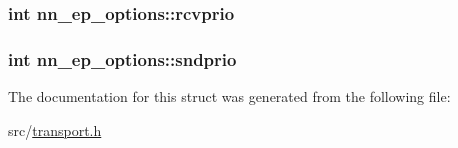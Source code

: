 \subsubsection[{rcvprio}]{\setlength{\rightskip}{0pt plus 5cm}int nn\+\_\+ep\+\_\+options\+::rcvprio}\hypertarget{structnn__ep__options_ad767f9fdbda05049cdb00e5122de9c7f}{}\label{structnn__ep__options_ad767f9fdbda05049cdb00e5122de9c7f}
\subsubsection[{sndprio}]{\setlength{\rightskip}{0pt plus 5cm}int nn\+\_\+ep\+\_\+options\+::sndprio}\hypertarget{structnn__ep__options_a094beafa8c4733b413c5982c9ab7552d}{}\label{structnn__ep__options_a094beafa8c4733b413c5982c9ab7552d}


The documentation for this struct was generated from the following file\+:\begin{DoxyCompactItemize}
\item 
src/\hyperlink{transport_8h}{transport.\+h}\end{DoxyCompactItemize}
